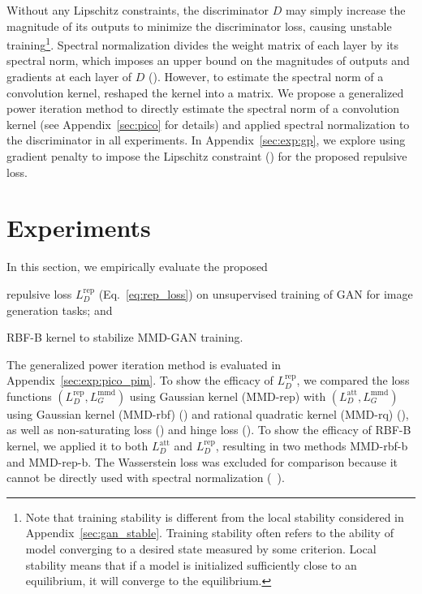 \documentclass{article} %
\theoremstyle{plain}
\newtheorem*{proposition 1*}{Proposition 1}
\begin{document}
Without any Lipschitz constraints, the discriminator \(D\) may simply increase the magnitude of its outputs to minimize the discriminator loss, causing unstable training\footnote{Note that training stability is different from the local stability considered in Appendix~\ref{sec:gan_stable}. Training stability often refers to the ability of model converging to a desired state measured by some criterion. Local stability means that if a model is initialized sufficiently close to an equilibrium, it will converge to the equilibrium.}. Spectral normalization divides the weight matrix of each layer by its spectral norm, which imposes an upper bound on the magnitudes of outputs and gradients at each layer of \(D\) (\cite{spectral}). However, to estimate the spectral norm of a convolution kernel, \cite{spectral} reshaped the kernel into a matrix. We propose a generalized power iteration method to directly estimate the spectral norm of a convolution kernel (see Appendix~\ref{sec:pico} for details) and applied spectral normalization to the discriminator in all experiments. In Appendix~\ref{sec:exp:gp}, we explore using gradient penalty to impose the Lipschitz constraint (\cite{wgan_gp, mmd_gan_t,mmd_gp}) for the proposed repulsive loss.  

\section{Experiments}
\label{sec:experiments}

In this section, we empirically evaluate the proposed 
\begin{enumerate*}[label=\arabic*)]
	\item repulsive loss \(L_{D}^{\text{rep}}\) (Eq.~\ref{eq:rep_loss}) on unsupervised training of GAN for image generation tasks; and
	\item RBF-B kernel to stabilize MMD-GAN training. 
\end{enumerate*}
The generalized power iteration method is evaluated in Appendix~\ref{sec:exp:pico_pim}. To show the efficacy of \(L_{D}^{\text{rep}}\), we compared the loss functions \((L_{D}^{\text{rep}}, L_{G}^{\text{mmd}})\) using Gaussian kernel (MMD-rep) with \((L_{D}^{\text{att}}, L_{G}^{\text{mmd}})\) using Gaussian kernel (MMD-rbf) (\cite{mmd_gan_g}) and rational quadratic kernel (MMD-rq) (\cite{mmd_gan_t}), as well as non-saturating loss (\cite{gan}) and hinge loss (\cite{implicit}). To show the efficacy of RBF-B kernel, we applied it to both \(L_{D}^{\text{att}}\) and \(L_{D}^{\text{rep}}\), resulting in two methods MMD-rbf-b and MMD-rep-b. The Wasserstein loss was excluded for comparison because it cannot be directly used with spectral normalization (~\cite{spectral}). 
\end{document}
